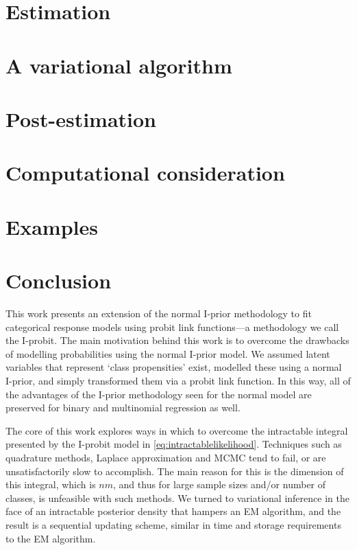\documentclass[a4paper,showframe,11pt]{report}
\begin{document}
\section{Estimation}


\section{A variational algorithm}\label{sec:iprobitvar}


\section{Post-estimation}


\section{Computational consideration}


\section{Examples}
\label{sec:iprobiteg}


\section{Conclusion}

This work presents an extension of the normal I-prior methodology to fit categorical response models using probit link functions---a methodology we call the I-probit.
The main motivation behind this work is to overcome the drawbacks of modelling probabilities using the normal I-prior model.
We assumed latent variables that represent `class propensities' exist, modelled these using a normal I-prior, and simply transformed them via a probit link function.
In this way, all of the advantages of the I-prior methodology seen for the normal model are preserved for binary and multinomial regression as well.

The core of this work explores ways in which to overcome the intractable integral presented by the I-probit model in \cref{eq:intractablelikelihood}.
Techniques such as quadrature methods, Laplace approximation and MCMC tend to fail, or are unsatisfactorily slow to accomplish.
The main reason for this is the dimension of this integral, which is $nm$, and thus for large sample sizes and/or number of classes, is unfeasible with such methods.
We turned to variational inference in the face of an intractable posterior density that hampers an EM algorithm, and the result is a sequential updating scheme, similar in time and storage requirements to the EM algorithm.
\end{document}
